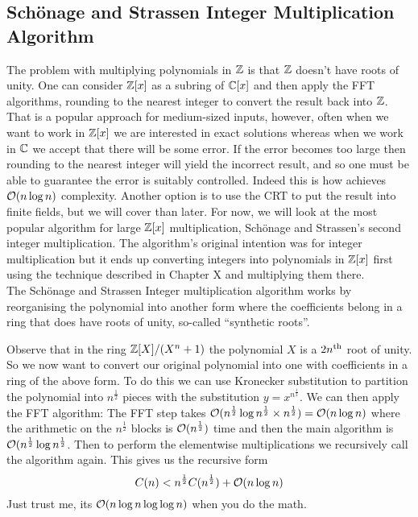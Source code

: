 \subsection{Sch\"{o}nage and Strassen Integer Multiplication Algorithm}
\label{subsec:schon-strass}

The problem with multiplying polynomials in ${\mathbb Z}$ is that ${\mathbb Z}$ doesn't have roots of unity. One can consider ${\mathbb Z}[x]$ as a subring of $\mathbb{C}[x]$ and then apply the FFT algorithms, rounding to the nearest integer to convert the result back into ${\mathbb Z}$. That is a popular approach for medium-sized inputs, however, often when we want to work in ${\mathbb Z}[x]$ we are interested in exact solutions whereas when we work in $\mathbb{C}$ we accept that there will be some error. If the error becomes too large then rounding to the nearest integer will yield the incorrect result, and so one must be able to guarantee the error is suitably controlled. Indeed this is how \cite{nlogn} achieves $\mathcal O(n\log n)$ complexity. Another option is to use the CRT to put the result into finite fields, but we will cover than later. For now, we will look at the most popular algorithm for large ${\mathbb Z}[x]$ multiplication, Sch\"{o}nage and Strassen's second integer multiplication. The algorithm's original intention was for integer multiplication but it ends up converting integers into polynomials in ${\mathbb Z}[x]$ first using the technique described in Chapter X and multiplying them there.\\

The Sch\"{o}nage and Strassen Integer multiplication algorithm works by reorganising the polynomial into another form where the coefficients belong in a ring that does have roots of unity, so-called ``synthetic roots''.


Observe that in the ring ${\mathbb Z}[X] / (X^n + 1)$ the polynomial $X$ is a $2n^{\textrm{th}}$ root of unity. So we now want to convert our original polynomial into one with coefficients in a ring of the above form. To do this we can use Kronecker substitution to partition the polynomial into $n^{\frac{1}{2}}$ pieces with the substitution $y = x^{n^{\frac{1}{2}}}$. We can then apply the FFT algorithm: The FFT step takes $\mathcal O(n^{\frac{1}{2}}\log n^{\frac{1}{2}} \times n^{\frac{1}{2}}) = \mathcal O(n \log n)$ where the arithmetic on the $n^{\frac{1}{2}}$ blocks is $\mathcal O(n^{\frac{1}{2}})$ time and then the main algorithm is $\mathcal O(n^{\frac{1}{2}}\log n^{\frac{1}{2}}$. Then to perform the elementwise multiplications we recursively call the algorithm again. This gives us the recursive form
\[
    C(n) < n^{\frac{1}{2}}C(n^{\frac{1}{2}}) + \mathcal O(n \log n)
\]
Just trust me, its $\mathcal O(n \log n \log \log n)$ when you do the math.

